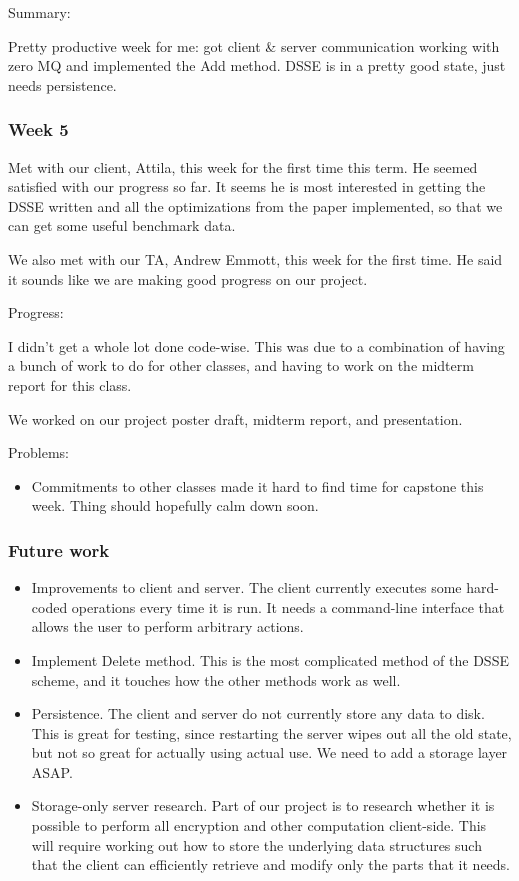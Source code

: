 \documentclass[onecolumn, draftclsnofoot,10pt, compsoc]{IEEEtran}
\begin{document}
\noindent Summary:

Pretty productive week for me: got client \& server communication working with zero MQ and implemented the Add method. DSSE is in a pretty good state, just needs persistence.

\subsubsection{Week 5}

Met with our client, Attila, this week for the first time this term. He seemed satisfied with our progress so far. It seems he is most interested in getting the DSSE written and all the optimizations from the paper implemented, so that we can get some useful benchmark data. 

We also met with our TA, Andrew Emmott, this week for the first time.
He said it sounds like we are making good progress on our project.

\noindent Progress:

I didn't get a whole lot done code-wise. This was due to a combination of having a bunch of work to do for other classes, and having to work on the midterm report for this class.

We worked on our project poster draft, midterm report, and presentation.

\noindent Problems:

\begin{itemize}
\item Commitments to other classes made it hard to find time for capstone this week. Thing should hopefully calm down soon.
\end{itemize}

\subsubsection{Future work}

\begin {itemize}
\item Improvements to client and server. The client currently executes some hard-coded operations every time it is run. It needs a command-line interface that allows the user to perform arbitrary actions.
\item Implement Delete method. This is the most complicated method of the DSSE scheme, and it touches how the other methods work as well.
\item Persistence. The client and server do not currently store any data to disk. This is great for testing, since restarting the server wipes out all the old state, but not so great for actually using actual use. We need to add a storage layer ASAP.
\item Storage-only server research. Part of our project is to research whether it is possible to perform all encryption and other computation client-side. This will require working out how to store the underlying data structures such that the client can efficiently retrieve and modify only the parts that it needs.
\end{itemize}
\end{document}
